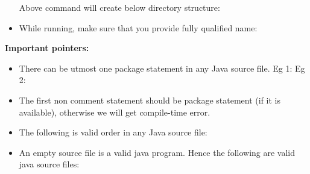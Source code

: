 \begin{flushleft}
\begin{itemize}
		Above command will create below directory structure:
		
		\item While running, make sure that you provide fully qualified name:
		\bigskip
		
	\end{itemize}

\newpage

\textbf{Important pointers:}
\begin{itemize}
	\item There can be utmost one package statement in any Java source file.
	\newline
	Eg 1:
	\bigskip
	Eg 2:
	\bigskip

	\item The first non comment statement should be package statement (if it is available), otherwise we will get compile-time error.
	\bigskip
	
	\item The following is valid order in any Java source file:
	\bigskip
	
	\item An empty source file is a valid java program. Hence the following are valid java source files:
	\bigskip

	\bigskip

	\bigskip

	\bigskip

	\bigskip
\end{itemize}

	
\end{flushleft}

\newpage

